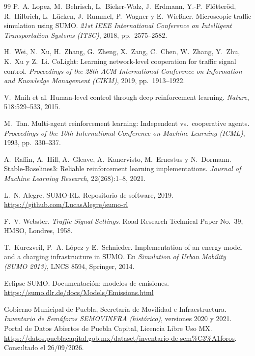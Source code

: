 \documentclass[11pt,letterpaper]{article}
\begin{document}
\begin{thebibliography}{99}
\small
\setlength{\itemsep}{0pt}
 P.~A. Lopez, M.~Behrisch, L.~Bieker-Walz, J.~Erdmann, Y.-P.~Flötteröd,
R.~Hilbrich, L.~Lücken, J.~Rummel, P.~Wagner y E.~Wießner. Microscopic traffic
simulation using SUMO. \emph{21st IEEE International Conference on Intelligent
Transportation Systems (ITSC)}, 2018, pp.~2575--2582.

 H.~Wei, N.~Xu, H.~Zhang, G.~Zheng, X.~Zang, C.~Chen, W.~Zhang,
Y.~Zhu, K.~Xu y Z.~Li. CoLight: Learning network-level cooperation for traffic
signal control. \emph{Proceedings of the 28th ACM International Conference on
Information and Knowledge Management (CIKM)}, 2019, pp.~1913--1922.

 V.~Mnih et al. Human-level control through deep reinforcement
learning. \emph{Nature}, 518:529--533, 2015.

 M.~Tan. Multi-agent reinforcement learning: Independent vs.\
cooperative agents. \emph{Proceedings of the 10th International Conference on
Machine Learning (ICML)}, 1993, pp.~330--337.

 A.~Raffin, A.~Hill, A.~Gleave, A.~Kanervisto, M.~Ernestus y
N.~Dormann. Stable-Baselines3: Reliable reinforcement learning implementations.
\emph{Journal of Machine Learning Research}, 22(268):1--8, 2021.

 L.~N. Alegre. SUMO-RL. Repositorio de software, 2019.
\url{https://github.com/LucasAlegre/sumo-rl}

 F.~V. Webster. \emph{Traffic Signal Settings}. Road Research
Technical Paper No.~39, HMSO, Londres, 1958.

 T.~Kurczveil, P.~A. López y E.~Schnieder. Implementation of an
energy model and a charging infrastructure in SUMO. En \emph{Simulation of Urban
Mobility (SUMO 2013)}, LNCS 8594, Springer, 2014.

 Eclipse SUMO. Documentación: modelos de emisiones.
\url{https://sumo.dlr.de/docs/Models/Emissions.html}

 Gobierno Municipal de Puebla, Secretaría de Movilidad e
Infraestructura. \emph{Inventario de Semáforos SEMOVINFRA (histórico)}, versiones
2020 y 2021. Portal de Datos Abiertos de Puebla Capital, Licencia Libre Uso MX.
\url{https://datos.pueblacapital.gob.mx/dataset/inventario-de-sem\%C3\%A1foros}.
Consultado el 26/09/2026.


\end{thebibliography}
\end{document}

